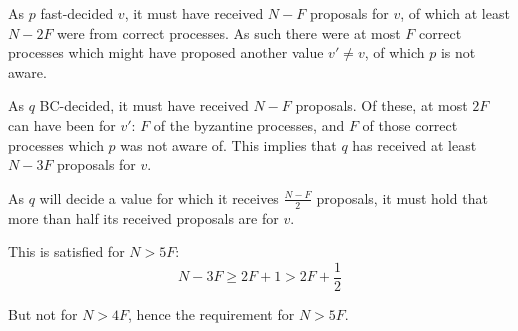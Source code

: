 \documentclass[a4paper]{scrreprt}
\begin{document}
As $p$ fast-decided $v$, it must have received $N - F$ proposals for $v$, of
which at least $N - 2F$ were from correct processes. As such there were at most
$F$ correct processes which might have proposed another value $v' \neq v$, of
which $p$ is not aware.

As $q$ BC-decided, it must have received $N - F$ proposals. Of these, at most
$2F$ can have been for $v'$: $F$ of the byzantine processes, and $F$ of those
correct processes which $p$ was not aware of. This implies that $q$ has
received at least $N - 3F$ proposals for $v$.

As $q$ will decide a value for which it receives $\frac{N - F}{2}$ proposals,
it must hold that more than half its received proposals are for $v$.

This is satisfied for $N > 5F$:
\[
	N - 3F \geq 2F + 1 > 2F + \frac{1}{2}
\]

But not for $N > 4F$, hence the requirement for $N > 5F$.
\end{document}
